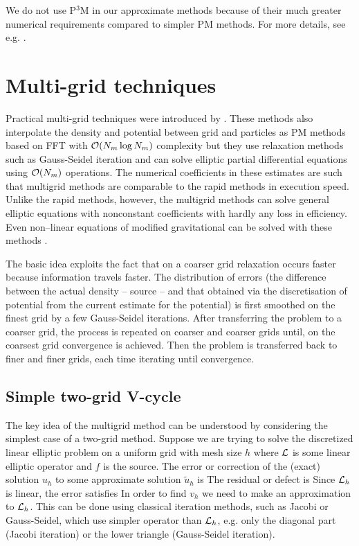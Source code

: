 We do not use P$^3$M in our approximate methods because of their much greater numerical requirements compared to simpler PM methods. For more details, see e.g. \textcite{Hockney:1988:CSU:62815}.
\section{Multi-grid techniques}
Practical multi-grid techniques were introduced by \textcite{10.2307/2006422}. These methods also interpolate the density and potential between grid and particles as PM methods based on FFT with $\mathcal{O}(N_m\log N_m)$ complexity but they use relaxation methods such as Gauss-Seidel iteration \parencite{doi:10.1002/zamm.19720520813} and can solve elliptic partial differential equations using $\mathcal{O}(N_m)$ operations. The numerical coefficients in these estimates are such that multigrid methods are comparable to the rapid methods in execution speed. Unlike the rapid methods, however, the multigrid methods can solve general elliptic equations with nonconstant coefficients with hardly any loss in efficiency. Even non--linear equations of modified gravitational can be solved with these methods \parencite{10.5555/42249}.

The basic idea exploits the fact that on a coarser grid relaxation occurs faster because information travels faster. The distribution of errors (the difference between the actual density -- source -- and that obtained via the discretisation of potential from the current estimate for the potential) is first smoothed on the finest grid by a few Gauss-Seidel iterations. After transferring the problem to a coarser grid, the process is repeated on coarser and coarser grids until, on the coarsest grid convergence is achieved. Then the problem is transferred back to finer and finer grids, each time iterating until convergence.
\subsection{Simple two-grid V-cycle}
The key idea of the multigrid method can be understood by considering the simplest case of a two-grid method. Suppose we are trying to solve the discretized linear elliptic problem on a uniform grid with mesh size $h$
where $\mathcal{L}$ is some linear elliptic operator and $f$ is the source. The error or correction of the (exact) solution $u_h$ to some approximate solution $\tilde u_h$ is
The residual or defect is
Since $\mathcal{L}_h$ is linear, the error satisfies
In order to find $v_h$ we need to make an approximation to $\mathcal{L}_h$. This can be done using classical iteration methods, such as Jacobi or Gauss-Seidel, which use simpler operator than $\mathcal{L}_h$, e.g. only the diagonal part (Jacobi iteration) or the lower triangle (Gauss-Seidel iteration).

